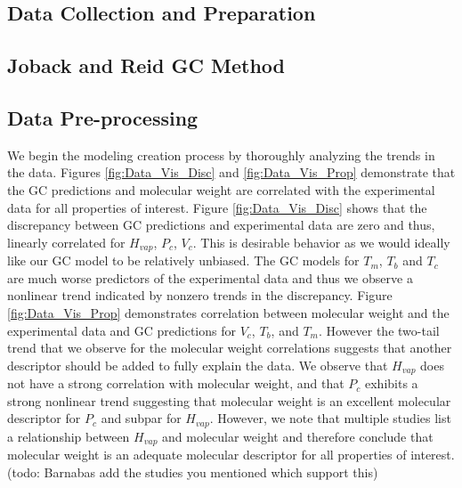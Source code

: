 \documentclass[journal=jacsat,manuscript=article]{achemso}
\begin{document}
\subsection{Data Collection and Preparation}
\subsection{Joback and Reid GC Method}
\subsection{Data Pre-processing} \label{sec:preprocess}
We begin the modeling creation process by thoroughly analyzing the trends in the data. Figures \ref{fig:Data_Vis_Disc} and \ref{fig:Data_Vis_Prop} demonstrate that the GC predictions and molecular weight are correlated with the experimental data for all properties of interest. Figure \ref{fig:Data_Vis_Disc} shows that the discrepancy between GC predictions and experimental data are zero and thus, linearly correlated for $H_{vap}$, $P_c$, $V_c$. This is desirable behavior as we would ideally like our GC model to be relatively unbiased. The GC models for $T_m$, $T_b$ and $T_c$ are much worse predictors of the experimental data and thus we observe a nonlinear trend indicated by nonzero trends in the discrepancy. Figure \ref{fig:Data_Vis_Prop} demonstrates correlation between molecular weight and the experimental data and GC predictions for $V_c$, $T_b$, and $T_m$. However the two-tail trend that we observe for the molecular weight correlations suggests that another descriptor should be added to fully explain the data. We observe that $H_{vap}$ does not have a strong correlation with molecular weight, and that $P_c$ exhibits a strong nonlinear trend suggesting that molecular weight is an excellent molecular descriptor for $P_c$ and subpar for $H_{vap}$. However, we note that multiple studies list a relationship between $H_{vap}$ and molecular weight and therefore conclude that molecular weight is an adequate molecular descriptor for all properties of interest. (todo: Barnabas add the studies you mentioned which support this)
\end{document}
